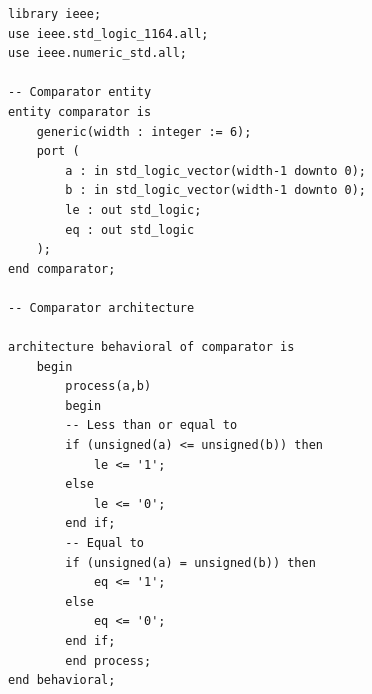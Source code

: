 \documentclass{article}
\begin{document}
\begin{lstlisting}[caption=Comparator VHDL Code, label=lst:comparator-vhdl-code]
library ieee;
use ieee.std_logic_1164.all;
use ieee.numeric_std.all;

-- Comparator entity
entity comparator is
    generic(width : integer := 6);
    port (
        a : in std_logic_vector(width-1 downto 0);
        b : in std_logic_vector(width-1 downto 0);
        le : out std_logic;
        eq : out std_logic
    );
end comparator;

-- Comparator architecture

architecture behavioral of comparator is
    begin
        process(a,b)
        begin 
        -- Less than or equal to
        if (unsigned(a) <= unsigned(b)) then
            le <= '1';
        else
            le <= '0';
        end if;
        -- Equal to
        if (unsigned(a) = unsigned(b)) then
            eq <= '1';
        else
            eq <= '0';
        end if;
        end process;
end behavioral;
\end{lstlisting}
\end{document}
